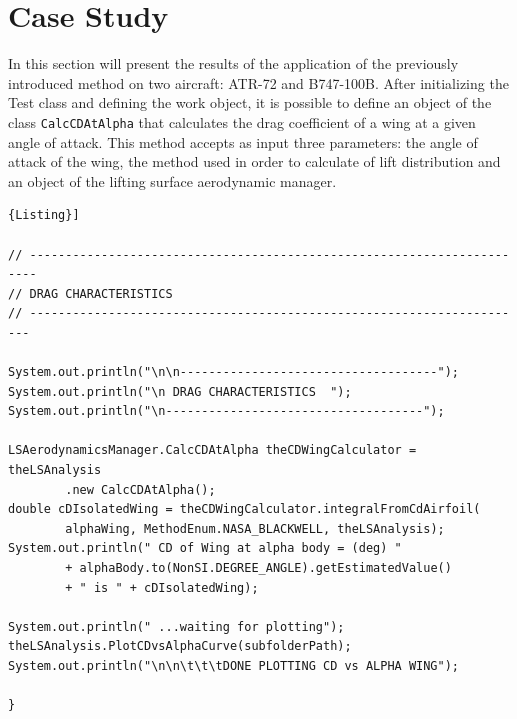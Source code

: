 \section{Case Study}

In this section will present the results of the application of the previously introduced method on two aircraft: ATR-72 and B747-100B.
After initializing the Test class and defining the work object, it is possible to define an object of the class \texttt{CalcCDAtAlpha} that calculates the drag coefficient of a wing at a given angle of attack. This method accepts as input three parameters: the angle of attack of the wing,  the method used in order to calculate of lift distribution and an object of the lifting surface aerodynamic manager.
\noindent \\
\begin{lstlisting}[frame=rbl,caption={{\footnotesize Use of Drag Calculator class}},label= [style=\bfseries]{Listing}]

// -----------------------------------------------------------------------
// DRAG CHARACTERISTICS 
// ----------------------------------------------------------------------

System.out.println("\n\n------------------------------------");
System.out.println("\n DRAG CHARACTERISTICS  ");
System.out.println("\n------------------------------------");

LSAerodynamicsManager.CalcCDAtAlpha theCDWingCalculator = theLSAnalysis
		.new CalcCDAtAlpha();
double cDIsolatedWing = theCDWingCalculator.integralFromCdAirfoil(
		alphaWing, MethodEnum.NASA_BLACKWELL, theLSAnalysis);
System.out.println(" CD of Wing at alpha body = (deg) "
		+ alphaBody.to(NonSI.DEGREE_ANGLE).getEstimatedValue()
		+ " is " + cDIsolatedWing);
	
System.out.println(" ...waiting for plotting");
theLSAnalysis.PlotCDvsAlphaCurve(subfolderPath);
System.out.println("\n\n\t\t\tDONE PLOTTING CD vs ALPHA WING");
			
}
\end{lstlisting}


%
%
%
%
% 
% 
%	 	 

